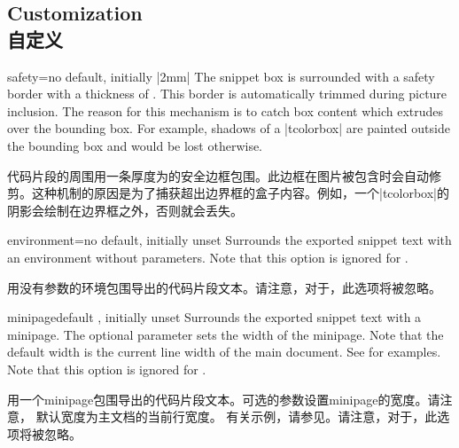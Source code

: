 \subsection{Customization\\自定义}\label{subsec:external_custom}

\begin{extTcbKey}[][doc new=2015-03-11]{safety}{=}{no default,
  initially |2mm|}
The snippet box is surrounded with a safety border with a thickness of
. This border is automatically trimmed during picture inclusion.
The reason for this mechanism is to catch  box content which
extrudes over the bounding box. For example, shadows of a |tcolorbox| are
painted outside the bounding box and would be lost otherwise.

代码片段的周围用一条厚度为的安全边框包围。此边框在图片被包含时会自动修剪。这种机制的原因是为了捕获超出边界框的盒子内容。例如，一个|tcolorbox|的阴影会绘制在边界框之外，否则就会丢失。
\end{extTcbKey}

\begin{extTcbKey}[][doc new=2015-03-11]{environment}{=}{no default, initially unset}
Surrounds the exported snippet text with an environment  without
parameters.
Note that this option is ignored for .

用没有参数的环境包围导出的代码片段文本。请注意，对于，此选项将被忽略。
\end{extTcbKey}



\begin{extTcbKey}[][doc new=2015-03-11]{minipage}{}{default \texttt{},
  initially unset}
Surrounds the exported snippet text with a minipage. The optional 
parameter sets the width of the minipage. Note that the default width is the
current line width of the main document.
See  for examples.
Note that this option is ignored for .

用一个minipage包围导出的代码片段文本。可选的参数设置minipage的宽度。请注意， 默认宽度为主文档的当前行宽度。 有关示例，请参见。请注意，对于，此选项将被忽略。
\end{extTcbKey}


